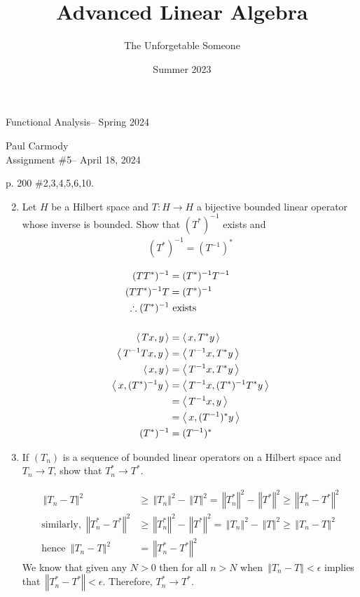 \documentclass[10pt,a4paper]{report}
\title{Advanced Linear Algebra}
\author{The Unforgetable Someone}
\date{Summer 2023}
\newcommand{\CLASSNAME}{Functional Analysis}
\newcommand{\STUDENTNAME}{Paul Carmody}
\newcommand{\ASSIGNMENT}{Assignment \#5}
\newcommand{\DUEDATE}{April 18, 2024}
\newcommand{\SEMESTER}{Spring 2024}
\newcommand{\NORM}[1]{\,\left \Vert #1 \right \Vert}
\begin{document}
\begin{center}
	\Large{\CLASSNAME -- \SEMESTER} \\
\end{center}
\begin{center}
	\STUDENTNAME \\
	\ASSIGNMENT -- \DUEDATE\\
\end{center} 

p. 200 \#2,3,4,5,6,10. 
\begin{enumerate}
	\setcounter{enumi}{1}
	\item Let $H$ be a Hilbert space and $T: H \to H$ a bijective bounded linear operator whose inverse is bounded.  Show that $(T^*)^{-1}$ exists and 
	\begin{align*}
		(T^*)^{-1}=(T^{-1})^*
	\end{align*}
	
	\begin{align*}
		(TT^*)^{-1} &= (T^*)^{-1}T^{-1} \\
		(TT^*)^{-1}T &= (T^*)^{-1}\\
		\therefore (T^*)^{-1} &\text{ exists}\\
		\\
		\left \langle\, Tx, y \,\right \rangle &= \left \langle\, x, T^*y \,\right \rangle\\
		\left \langle\, T^{-1}Tx, y \,\right \rangle &= \left \langle\, T^{-1}x, T^*y \,\right \rangle\\
		\left \langle\, x,y \,\right \rangle &= \left \langle\, T^{-1}x, T^*y \,\right \rangle\\
		\left \langle\, x, (T^*)^{-1}y \,\right \rangle &= \left \langle\, T^{-1}x, (T^*)^{-1}T^*y \,\right \rangle\\
		&= \left \langle\, T^{-1}x, y \,\right \rangle \\
		&= \left \langle\, x, (T^{-1})^*y \,\right \rangle \\
		(T^*)^{-1}&=(T^{-1})^*
	\end{align*}
	
	\item If $(T_n)$ is a sequence of bounded linear operators on a Hilbert space and $T_n \to T$, show that $T_n^*\to T^*$.
	
	\begin{align*}
		\NORM{T_n -T}^2 &\ge \NORM{T_n}^2 - \NORM{T}^2 = \NORM{T_n^*}^2 - \NORM{T^*}^2 \ge \NORM{T_n^*-T^*}^2\\
		\text{similarly, }  \NORM{T_n^*-T^*}^2 &\ge  \NORM{T_n^*}^2 - \NORM{T^*}^2 = \NORM{T_n}^2 - \NORM{T}^2 \ge \NORM{T_n -T}^2 \\
		\text{hence } \NORM{T_n -T}^2 &= \NORM{T_n^*-T^*}^2
	\end{align*}	We know that given any $N>0$ then for all $n > N$ when $\NORM{T_n -T} < \epsilon$ implies that $\NORM{T_n^*-T^*}<\epsilon$.  Therefore, $T_n^* \to T^*$.
	

\end{enumerate}
\end{document}
